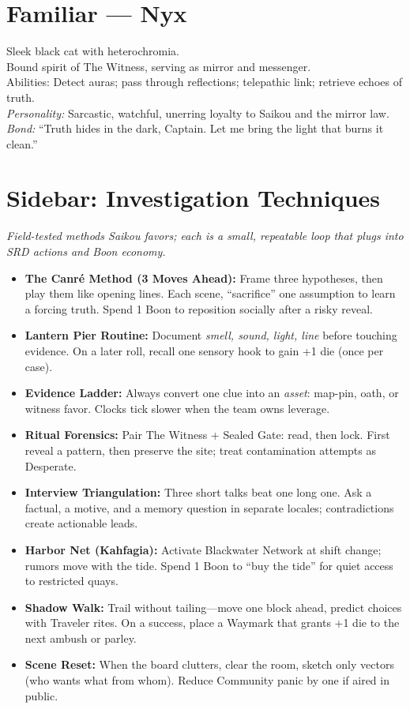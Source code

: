 \documentclass[11pt]{article}
\begin{document}
\section*{Familiar — Nyx}
Sleek black cat with heterochromia.\\
Bound spirit of The Witness, serving as mirror and messenger.\\
Abilities: Detect auras; pass through reflections; telepathic link; retrieve echoes of truth.\\
\emph{Personality:} Sarcastic, watchful, unerring loyalty to Saikou and the mirror law.\\
\emph{Bond:} “Truth hides in the dark, Captain. Let me bring the light that burns it clean.”


\section*{Sidebar: Investigation Techniques}
\emph{Field-tested methods Saikou favors; each is a small, repeatable loop that plugs into SRD actions and Boon economy.}
\begin{itemize}
  \item \textbf{The Canré Method (3 Moves Ahead):} Frame three hypotheses, then play them like opening lines. Each scene, “sacrifice” one assumption to learn a forcing truth. Spend 1 Boon to reposition socially after a risky reveal.
  \item \textbf{Lantern Pier Routine:} Document \emph{smell, sound, light, line} before touching evidence. On a later roll, recall one sensory hook to gain +1 die (once per case).
  \item \textbf{Evidence Ladder:} Always convert one clue into an \emph{asset}: map-pin, oath, or witness favor. Clocks tick slower when the team owns leverage.
  \item \textbf{Ritual Forensics:} Pair The Witness + Sealed Gate: read, then lock. First reveal a pattern, then preserve the site; treat contamination attempts as Desperate.
  \item \textbf{Interview Triangulation:} Three short talks beat one long one. Ask a factual, a motive, and a memory question in separate locales; contradictions create actionable leads.
  \item \textbf{Harbor Net (Kahfagia):} Activate Blackwater Network at shift change; rumors move with the tide. Spend 1 Boon to “buy the tide” for quiet access to restricted quays.
  \item \textbf{Shadow Walk:} Trail without tailing—move one block ahead, predict choices with Traveler rites. On a success, place a Waymark that grants +1 die to the next ambush or parley.
  \item \textbf{Scene Reset:} When the board clutters, clear the room, sketch only vectors (who wants what from whom). Reduce Community panic by one if aired in public.
\end{itemize}
\end{document}
